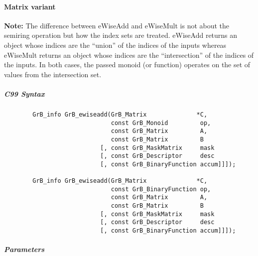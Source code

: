 
\paragraph{Matrix variant}

{\bf Note:} The difference between {\sf eWiseAdd} and {\sf eWiseMult} is not about the semiring operation but how the index sets are treated.
{\sf eWiseAdd} returns an object whose indices are the ``union'' of the indices of the inputs whereas  
{\sf eWiseMult} returns an object whose indices are the ``intersection'' of the indices of the inputs. In both cases, the passed monoid (or function) operates on the 
set of values from the intersection set. 



\subparagraph{C99 Syntax}

\begin{verbatim}
        GrB_info GrB_ewiseadd(GrB_Matrix              *C,
                              const GrB_Monoid         op, 
                              const GrB_Matrix         A,
                              const GrB_Matrix         B
                           [, const GrB_MaskMatrix     mask
                           [, const GrB_Descriptor     desc
                           [, const GrB_BinaryFunction accum]]]);
                            
        GrB_info GrB_ewiseadd(GrB_Matrix              *C,
                              const GrB_BinaryFunction op, 
                              const GrB_Matrix         A,
                              const GrB_Matrix         B
                           [, const GrB_MaskMatrix     mask
                           [, const GrB_Descriptor     desc
                           [, const GrB_BinaryFunction accum]]]);
\end{verbatim}

\subparagraph{Parameters}

